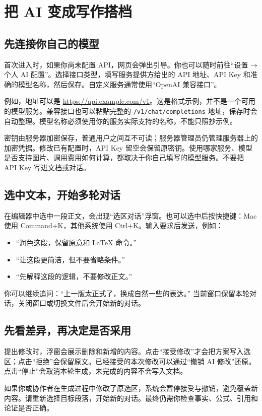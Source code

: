 \section{把 AI 变成写作搭档}
\subsection{先连接你自己的模型}
首次进入时，如果你尚未配置 API，网页会弹出引导。你也可以随时前往“设置 → 个人 AI 配置”。选择接口类型，填写服务提供方给出的 API 地址、API Key 和准确的模型名称，然后保存。自定义服务通常使用“OpenAI 兼容接口”。

例如，地址可以是 \url{https://api.example.com/v1}。这是格式示例，并不是一个可用的模型服务。兼容接口也可以粘贴完整的 \texttt{/v1/chat/completions} 地址，保存时会自动整理。模型名称必须使用你的服务实际支持的名称，不能只照抄示例。

密钥由服务器加密保存，普通用户之间互不可读；服务器管理员仍管理服务器上的加密凭据。修改已有配置时，API Key 留空会保留原密钥。使用哪家服务、模型是否支持图片、调用费用如何计算，都取决于你自己填写的模型服务。不要把 API Key 写进文档或对话。

\subsection{选中文本，开始多轮对话}
在编辑器中选中一段正文，会出现“选区对话”浮窗。也可以选中后按快捷键：Mac 使用 Command+K，其他系统使用 Ctrl+K。输入要求后发送，例如：
\begin{itemize}
\item “润色这段，保留原意和 LaTeX 命令。”
\item “让这段更简洁，但不要省略条件。”
\item “先解释这段的逻辑，不要修改正文。”
\end{itemize}
你可以继续追问：“上一版太正式了，换成自然一些的表达。” 当前窗口保留本轮对话，关闭窗口或切换文件后会开始新的对话。

\subsection{先看差异，再决定是否采用}
提出修改时，浮窗会展示删除和新增的内容。点击“接受修改”才会把方案写入选区；点击“拒绝”会保留原文。已经接受的本次修改可以通过“撤销 AI 修改”还原。点击“停止”会取消本轮生成，未完成的内容不会写入文档。

如果你或协作者在生成过程中修改了原选区，系统会暂停接受与撤销，避免覆盖新内容。请重新选择目标段落，开始新的对话。最终仍需你检查事实、公式、引用和论证是否正确。

